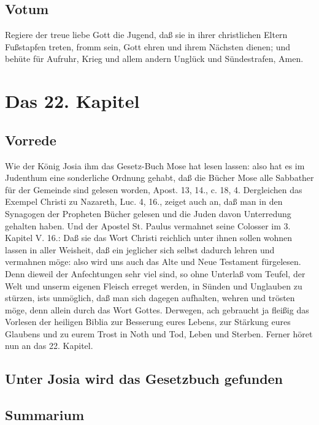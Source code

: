 \section{Votum}

Regiere der treue liebe Gott die Jugend, daß sie in ihrer christlichen Eltern Fußstapfen treten, fromm sein, Gott ehren und ihrem Nächsten dienen; und behüte für Aufruhr, Krieg und allem andern Unglück und Sündestrafen, Amen.

\chapter{Das 22. Kapitel}

\section{Vorrede}

Wie der König Josia ihm das Gesetz-Buch Mose hat lesen lassen: also hat es im Judenthum eine sonderliche Ordnung gehabt, daß die Bücher Mose alle Sabbather für der Gemeinde sind gelesen worden, Apost. 13, 14., c. 18, 4. Dergleichen das Exempel Christi zu Nazareth, Luc. 4, 16., zeiget auch an, daß man in den Synagogen der Propheten Bücher gelesen und die Juden davon Unterredung gehalten haben. Und der Apostel St. Paulus vermahnet seine Colosser im 3. Kapitel V. 16.: Daß sie das Wort Christi reichlich unter ihnen sollen wohnen lassen in aller Weisheit, daß ein jeglicher sich selbst dadurch lehren und vermahnen möge: also wird uns auch das Alte und Neue Testament fürgelesen. Denn dieweil der Anfechtungen sehr viel sind, so ohne Unterlaß vom Teufel, der Welt und unserm eigenen Fleisch erreget werden, in Sünden und Unglauben zu stürzen, ists unmöglich, daß man sich dagegen aufhalten, wehren und trösten möge, denn allein durch das Wort Gottes. Derwegen, ach gebraucht ja fleißig das Vorlesen der heiligen Biblia zur Besserung eures Lebens, zur Stärkung eures Glaubens und zu eurem Trost in Noth und Tod, Leben und Sterben. Ferner höret nun an das 22. Kapitel.

\section{Unter Josia wird das Gesetzbuch gefunden}

\section{Summarium}


